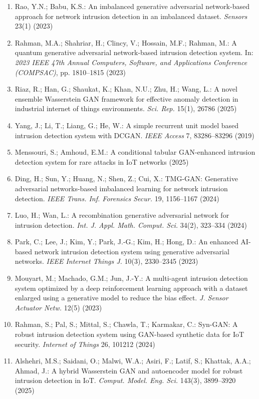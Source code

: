 \documentclass[a4paper]{article}
\begin{document}
\begin{enumerate}[leftmargin=1.2cm, itemsep=1pt, parsep=0pt]
    \item Rao, Y.N.; Babu, K.S.: An imbalanced generative adversarial network-based approach for network intrusion detection in an imbalanced dataset. \textit{Sensors} 23(1) (2023)
    \item Rahman, M.A.; Shahriar, H.; Clincy, V.; Hossain, M.F.; Rahman, M.: A quantum generative adversarial network-based intrusion detection system. In: \textit{2023 IEEE 47th Annual Computers, Software, and Applications Conference (COMPSAC)}, pp. 1810--1815 (2023)
    \item Riaz, R.; Han, G.; Shaukat, K.; Khan, N.U.; Zhu, H.; Wang, L.: A novel ensemble Wasserstein GAN framework for effective anomaly detection in industrial internet of things environments. \textit{Sci. Rep.} 15(1), 26786 (2025)
    \item Yang, J.; Li, T.; Liang, G.; He, W.: A simple recurrent unit model based intrusion detection system with DCGAN. \textit{IEEE Access} 7, 83286--83296 (2019)
    \item Menssouri, S.; Amhoud, E.M.: A conditional tabular GAN-enhanced intrusion detection system for rare attacks in IoT networks (2025)
    \item Ding, H.; Sun, Y.; Huang, N.; Shen, Z.; Cui, X.: TMG-GAN: Generative adversarial networks-based imbalanced learning for network intrusion detection. \textit{IEEE Trans. Inf. Forensics Secur.} 19, 1156--1167 (2024)
    \item Luo, H.; Wan, L.: A recombination generative adversarial network for intrusion detection. \textit{Int. J. Appl. Math. Comput. Sci.} 34(2), 323--334 (2024)
    \item Park, C.; Lee, J.; Kim, Y.; Park, J.-G.; Kim, H.; Hong, D.: An enhanced AI-based network intrusion detection system using generative adversarial networks. \textit{IEEE Internet Things J.} 10(3), 2330--2345 (2023)
    \item Mouyart, M.; Machado, G.M.; Jun, J.-Y.: A multi-agent intrusion detection system optimized by a deep reinforcement learning approach with a dataset enlarged using a generative model to reduce the bias effect. \textit{J. Sensor Actuator Netw.} 12(5) (2023)
    \item Rahman, S.; Pal, S.; Mittal, S.; Chawla, T.; Karmakar, C.: Syn-GAN: A robust intrusion detection system using GAN-based synthetic data for IoT security. \textit{Internet of Things} 26, 101212 (2024)
    \item Alshehri, M.S.; Saidani, O.; Malwi, W.A.; Asiri, F.; Latif, S.; Khattak, A.A.; Ahmad, J.: A hybrid Wasserstein GAN and autoencoder model for robust intrusion detection in IoT. \textit{Comput. Model. Eng. Sci.} 143(3), 3899--3920 (2025)

\end{enumerate}
\end{document}
